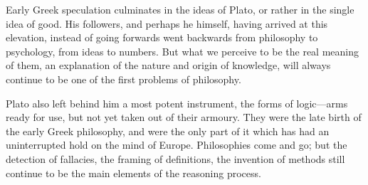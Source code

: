 \documentclass[11pt,letter]{article}
\begin{document}
\par  Early Greek speculation culminates in the ideas of Plato, or rather in the single idea of good. His followers, and perhaps he himself, having arrived at this elevation, instead of going forwards went backwards from philosophy to psychology, from ideas to numbers. But what we perceive to be the real meaning of them, an explanation of the nature and origin of knowledge, will always continue to be one of the first problems of philosophy.

\par  Plato also left behind him a most potent instrument, the forms of logic—arms ready for use, but not yet taken out of their armoury. They were the late birth of the early Greek philosophy, and were the only part of it which has had an uninterrupted hold on the mind of Europe. Philosophies come and go; but the detection of fallacies, the framing of definitions, the invention of methods still continue to be the main elements of the reasoning process.
\end{document}
